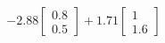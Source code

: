 \documentclass[preview]{standalone}
\begin{document}
\begin{align*}
-2.88 \begin{bmatrix} 0.8 \\ 0.5 \end{bmatrix} + 1.71 \begin{bmatrix} 1 \\ 1.6 \end{bmatrix}
\end{align*}
\end{document}
